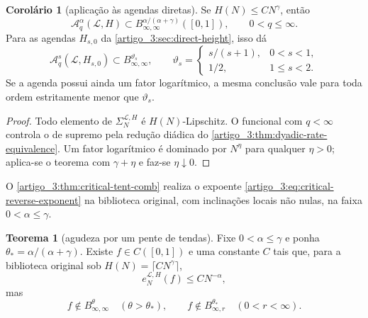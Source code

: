 \documentclass[12pt,a4paper]{article}
\theoremstyle{preciso}
\theoremstyle{definition}
\newcommand{\Library}{\mathcal{L}}
\theoremstyle{preciso}
\newtheorem{theorem}[teorema]{Teorema}
\theoremstyle{preciso}
\theoremstyle{preciso}
\theoremstyle{preciso}
\newtheorem{corollary}[teorema]{Corolário}
\theoremstyle{definition}
\theoremstyle{preciso}
\theoremstyle{definition}
\theoremstyle{preciso}
\theoremstyle{preciso}
\theoremstyle{definition}
\begin{document}
\begin{corollary}[aplicação às agendas diretas]\label{map:artigo_3:5.8}
\label{artigo_3:cor:raw-library-inverse}
Se $H(N)\le C N^\gamma$, então
\begin{equation}
 \mathscr A_q^\alpha(\Library,H)
 \subset B^{\alpha/(\alpha+\gamma)}_{\infty,\infty}([0,1]),
 \qquad 0<q\le\infty.
 \label{artigo_3:eq:raw-library-inverse}
\end{equation}
Para as agendas $H_{s,0}$ da \cref{artigo_3:sec:direct-height}, isso dá
\begin{equation}
 \mathscr A_q^s(\Library,H_{s,0})
 \subset B^{\vartheta_s}_{\infty,\infty},
 \qquad
 \vartheta_s=
 \begin{cases}
 s/(s+1),&0<s<1,\\
 1/2,&1\le s<2.
 \end{cases}
 \label{artigo_3:eq:corrected-schedule-raw-inverse}
\end{equation}
Se a agenda possui ainda um fator logarítmico, a mesma conclusão vale para
toda ordem estritamente menor que $\vartheta_s$.
\end{corollary}

\begin{proof}
Todo elemento de $\Sigma_N^{\Library,H}$ é $H(N)$-Lipschitz. O funcional com
$q<\infty$ controla o de supremo pela redução diádica do
\cref{artigo_3:thm:dyadic-rate-equivalence}. Um fator logarítmico é dominado por
$N^\eta$ para qualquer $\eta>0$; aplica-se o teorema com
$\gamma+\eta$ e faz-se $\eta\downarrow0$.
\end{proof}

O \cref{artigo_3:thm:critical-tent-comb} realiza o expoente \eqref{artigo_3:eq:critical-reverse-exponent} na biblioteca original, com inclinações locais não nulas, na faixa $0<\alpha\le\gamma$.

\begin{theorem}[agudeza por um pente de tendas]\label{map:artigo_3:5.9}
\label{artigo_3:thm:critical-tent-comb}
Fixe $0<\alpha\le\gamma$ e ponha
$\theta_*=\alpha/(\alpha+\gamma)$. Existe
$f\in C([0,1])$ e uma constante $C$ tais que, para a biblioteca original sob
$H(N)=\lceil CN^\gamma\rceil$,
\begin{equation}
 e_N^{\Library,H}(f)\le CN^{-\alpha},
 \label{artigo_3:eq:comb-approximation-rate}
\end{equation}
mas
\begin{equation}
 f\notin B^\theta_{\infty,\infty}\quad(\theta>\theta_*),
 \qquad
 f\notin B^{\theta_*}_{\infty,r}\quad(0<r<\infty).
 \label{artigo_3:eq:comb-sharpness}
\end{equation}
\end{theorem}
\end{document}
